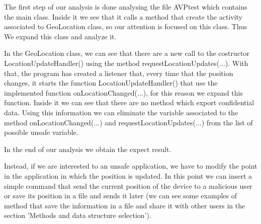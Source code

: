 \documentclass[letterpaper,twocolumn,10pt]{article}
\begin{document}
The first step of our analysis is done analysing the file AVPtest which contains the main class. Inside it we see that it calls a method that create the activity associated to GeoLocation class, so our attention is focused on this class. Thus We expand this class and analyze it.

In the GeoLocation class, we can see that there are a new call to the costructor LocationUpdateHandler() using the method requestLocationUpdates(...). With that, the program has created a listener that, every time that the position changes, it starts the function LocationUpdateHandler() that use the implemented function onLocationChanged(...), for this reason we expand this function. Inside it we can see that there are no method which export confidential data. Using this information we can eliminate the variable associated to the method onLocationChanged(...) and requestLocationUpdates(...) from the list of possible unsafe variable.

In the end of our analysis we obtain the expect result.

Instead, if we are interested to an unsafe application, we have to modify the point in the application in which the position is updated. In this point we can insert a simple command that send the current position of the device to a malicious user or save its position in a file and sends it later (we can see some examples of method that save the information in a file and share it with other users in the section 'Methods and data structure selection').
\end{document}
